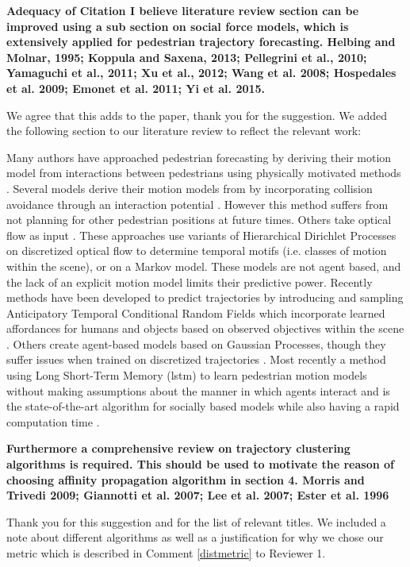 \documentclass[usenames,dvipsnames]{article}
\newcommand{\Ram}[1]{{\normalsize{\textbf{({\color{green}Ram:\ }#1)}}}}
\providecommand{\response}[1]{
\noindent
\noindent\colorbox{gray!20}{
\parbox{\textwidth}{
\setlength{\parskip}{.1in}
\setlength{\parindent}{.1in}
#1}
}
}
\begin{document}
\begin{enumerate}
\begin{item}
\end{item}

\begin{item}
\textbf{Adequacy of Citation
I believe literature review section can be improved using a sub section
on social force models, which is extensively applied for pedestrian
trajectory forecasting. 
Helbing and Molnar, 1995; Koppula and Saxena, 2013; Pellegrini et al.,
2010; Yamaguchi et al., 2011; Xu et al., 2012; Wang et al. 2008;
Hospedales et al. 2009; Emonet et al. 2011; Yi et al. 2015.}
\end{item}

We agree that this adds to the paper, thank you for the suggestion. 
We added the following section to our literature review to reflect the relevant work:

\reversemarginpar{}
	\response{Many authors have approached pedestrian forecasting by deriving their motion model from interactions between pedestrians using physically motivated methods \cite{Helbing1995,Xu2012}. 
	Several models derive their motion models from \cite{Helbing1995} by incorporating collision avoidance through an interaction potential \cite{Pellegrini2009,Yamaguchi2011,Yi2016}. 
	However this method suffers from not planning for other pedestrian positions at future times. 
	Others take optical flow as input \cite{Hospedales2009,Wang2009,Emonet2011}.
	These approaches use variants of Hierarchical Dirichlet Processes on discretized optical flow to determine temporal motifs (i.e. classes of motion within the scene), or on a Markov model. 
	 These models are not agent based, and the lack of an explicit motion model limits their predictive power. 
	 Recently methods have been developed to predict trajectories by introducing and sampling Anticipatory Temporal Conditional Random Fields which incorporate learned affordances for humans and objects based on observed objectives within the scene \cite{Koppula2016}. 
	 Others create agent-based models based on Gaussian Processes, though they suffer issues when trained on discretized trajectories \cite{Tay2008,Wang2008,Trautman2015}. 
	Most recently a method using Long Short-Term Memory (lstm) to learn pedestrian motion models without making assumptions about the manner in which agents interact and is the state-of-the-art algorithm for socially based models while also having a rapid computation time \cite{Alahi2016}.}

\begin{item}
\textbf{Furthermore a comprehensive review on trajectory clustering algorithms
is required. This should be used to motivate the reason of choosing
affinity propagation algorithm in section 4. 
Morris and Trivedi 2009; Giannotti et al. 2007; Lee et al. 2007;
Ester et al. 1996 }

Thank you for this suggestion and for the list of relevant titles.
 We included a note about different algorithms as well as a justification for why we chose our metric which is described in Comment \ref{distmetric} to Reviewer 1. 

\end{item}
\end{enumerate}
\end{document}
